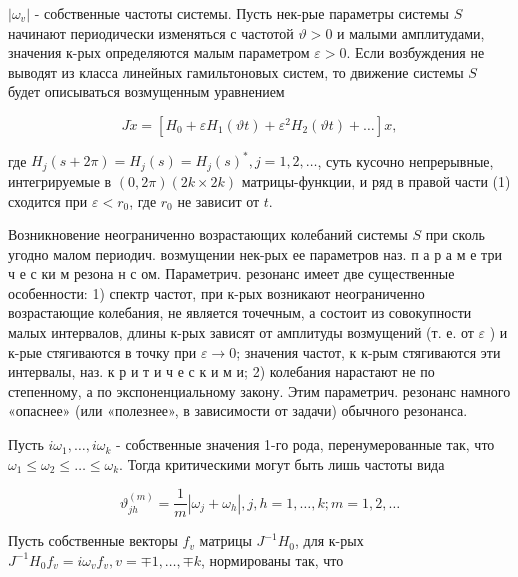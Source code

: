 \documentclass[10pt]{article}
\begin{document}
$\left|\omega_{v}\right|$ - собственные частоты системы. Пусть нек-рые параметры системы $S$ начинают периодически изменяться с частотой $\vartheta>0$ и малыми амплитудами, значения к-рых определяются малым параметром $\varepsilon>0$. Если возбуждения не выводят из класса линейных гамильтоновых систем, то движение системы $S$ будет описываться возмущенным уравнением



\[

J \dot{x}=\left[H_{0}+\varepsilon H_{1}(\mathfrak{\vartheta} t)+\varepsilon^{2} H_{2}(\mathfrak{\vartheta} t)+\ldots\right] x,

\]



где $H_{j}(s+2 \pi)=H_{j}(s)=H_{j}(s)^{*}, j=1,2, \ldots$, суть кусочно непрерывные, интегрируемые в $(0,2 \pi)(2 k \times 2 k)$ матрицы-функции, и ряд в правой части (1) сходится при $\varepsilon<r_{0}$, где $r_{0}$ не зависит от $t$.



Возникновение неограниченно возрастающих колебаний системы $S$ при сколь угодно малом периодич. возмущении нек-рых ее параметров наз. п а р а м е три ч е с ки м резона н с ом. Параметрич. резонанс имеет две существенные особенности: 1) спектр частот, при к-рых возникают неограниченно возрастающие колебания, не является точечным, а состоит из совокупности малых интервалов, длины к-рых зависят от амплитуды возмущений (т. е. от $\varepsilon$ ) и к-рые стягиваются в точку при $\varepsilon \rightarrow 0$; значения частот, к к-рым стягиваются эти интервалы, наз. к р и т и ч е с к и м и; 2) колебания нарастают не по степенному, а по экспоненциальному закону. Этим параметрич. резонанс намного «опаснее» (или «полезнее», в зависимости от задачи) обычного резонанса.



Пусть $i \omega_{1}, \ldots, i \omega_{k}$ - собственные значения 1-го рода, перенумерованные так, что $\omega_{1} \leqslant \omega_{2} \leqslant \ldots \leqslant \omega_{k}$. Тогда критическими могут быть лишь частоты вида



\[

\vartheta_{j h}^{(m)}=\frac{1}{m}\left|\omega_{j}+\omega_{h}\right|, j, h=1, \ldots, k ; m=1,2, \ldots

\]



Пусть собственные векторы $f_{v}$ матрицы $J^{-1} H_{0}$, для к-рых $J^{-1} H_{0} f_{v}=i \omega_{v} f_{v}, v=\mp 1, \ldots, \mp k$, нормированы так, что
\end{document}
